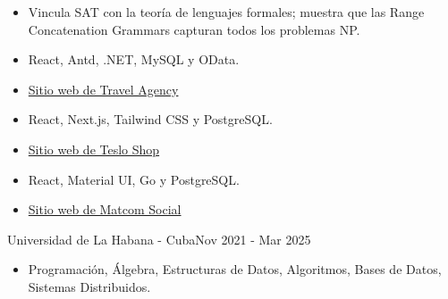 



\begin{itemize}
	\item Vincula SAT con la teoría de lenguajes formales; muestra que las Range Concatenation Grammars capturan todos los problemas NP.
\end{itemize}

\divider


\begin{itemize}
	\item React, Antd, .NET, MySQL y OData.
	\item \href{https://travel-agency-client.onrender.com/}{Sitio web de Travel Agency}
\end{itemize}

\divider


\begin{itemize}
    \item React, Next.js, Tailwind CSS y PostgreSQL.
    \item \href{https://teslo-shop-phi.vercel.app/}{Sitio web de Teslo Shop}
\end{itemize}

\divider


\begin{itemize}
    \item React, Material UI, Go y PostgreSQL.
    \item \href{https://social-network-client-6f8h.onrender.com/}{Sitio web de Matcom Social}
\end{itemize}


{Universidad de La Habana - Cuba}{Nov 2021 - Mar 2025}{}
\begin{itemize}
    \item Programación, Álgebra, Estructuras de Datos, Algoritmos, Bases de Datos, Sistemas Distribuidos.
\end{itemize}


